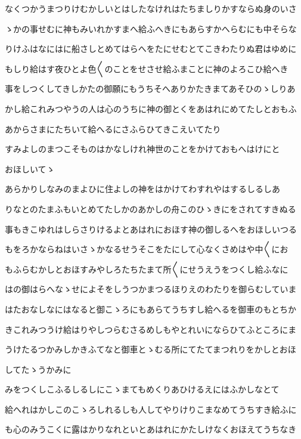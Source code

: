 \documentclass[a4paper,11pt,landscape]{ltjtarticle}
\begin{document}
\par\medskip
なくつかうまつりけむかしいとはしたなけれはたちましりかすならぬ身のいさ
\par\medskip
ゝかの事せむに神もみいれかすまへ給ふへきにもあらすかへらむにも中そらな
\par\medskip
りけふはなにはに船さしとめてはらへをたにせむとてこきわたりぬ君はゆめに
\par\medskip
もしり給はす夜ひとよ色〱のことをせさせ給ふまことに神のよろこひ給へき
\par\medskip
事をしつくしてきしかたの御願にもうちそへありかたきまてあそひのゝしりあ
\par\medskip
かし給これみつやうの人は心のうちに神の御とくをあはれにめてたしとおもふ
\par\medskip
あからさまにたちいて給へるにさふらひてきこえいてたり
\par\medskip
すみよしのまつこそものはかなしけれ神世のことをかけておもへはけにと
\par\medskip
おほしいてゝ
\par\medskip
あらかりしなみのまよひに住よしの神をはかけてわすれやはするしるしあ
\par\medskip
りなとのたまふもいとめてたしかのあかしの舟このひゝきにをされてすきぬる
\par\medskip
事もきこゆれはしらさりけるよとあはれにおほす神の御しるへをおほしいつる
\par\medskip
もをろかならねはいさゝかなるせうそこをたにして心なくさめはや中〱にお
\par\medskip
もふらむかしとおほすみやしろたちたまて所〱にせうえうをつくし給ふなに
\par\medskip
はの御はらへなゝせによそをしうつかまつるほりえのわたりを御らむしていま
\par\medskip
はたおなしなにはなると御こゝろにもあらてうちすし給へるを御車のもとちか
\par\medskip
きこれみつうけ給はりやしつらむさるめしもやとれいにならひてふところにま
\par\medskip
うけたるつかみしかきふてなと御車とゝむる所にてたてまつれりをかしとおほ
\par\medskip
してたゝうかみに
\par\medskip
みをつくしこふるしるしにこゝまてもめくりあひけるえにはふかしなとて
\par\medskip
給へれはかしこのこゝろしれるしも人してやりけりこまなめてうちすき給ふに
\par\medskip
も心のみうこくに露はかりなれといとあはれにかたしけなくおほえてうちなき
\par\medskip
\end{document}
